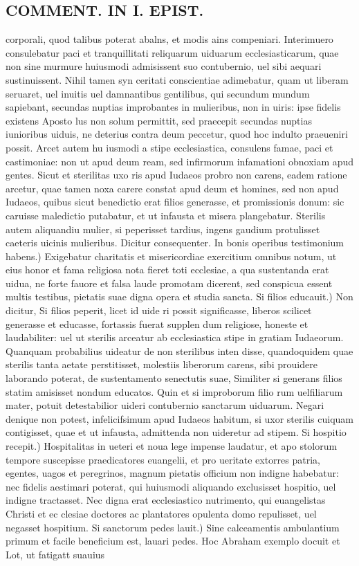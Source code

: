 \documentclass{article}
\begin{document}
\begin{pages}
\section*{COMMENT. IN I. EPIST. }
\marginpar{[ p.518 ]}\pstart corporali, quod talibus poterat abalns, et modis ains compeniari. Interimuero consulebatur paci et tranquillitati reliquarum uiduarum ecclesiasticarum, quae non sine murmure huiusmodi admisissent suo contubernio, uel sibi aequari sustinuissent. Nihil tamen syn ceritati conscientiae adimebatur, quam ut liberam seruaret, uel inuitis uel damnantibus gentilibus, qui secundum mundum sapiebant, secundas nuptias improbantes in mulieribus, non in uiris: ipse fidelis existens Aposto lus non solum permittit, sed praecepit secundas nuptias iunioribus uiduis, ne deterius contra deum peccetur, quod hoc indulto praeueniri possit. Arcet autem hu iusmodi a stipe ecclesiastica, consulens famae, paci et castimoniae: non ut apud deum ream, sed infirmorum infamationi obnoxiam apud gentes. Sicut et sterilitas uxo ris apud Iudaeos probro non carens, eadem ratione arcetur, quae tamen noxa carere constat apud deum et homines, sed non apud Iudaeos, quibus sicut benedictio erat filios generasse, et promissionis donum: sic caruisse maledictio putabatur, et ut infausta et misera plangebatur. Sterilis autem aliquandiu mulier, si peperisset tardius, ingens gaudium protulisset caeteris uicinis mulieribus. Dicitur consequenter. In bonis operibus testimonium habens.) Exigebatur charitatis et misericordiae exercitium omnibus notum, ut eius honor et fama religiosa nota fieret toti ecclesiae, a qua sustentanda erat uidua, ne forte fauore et falsa laude promotam dicerent, sed conspicua essent multis testibus, pietatis suae digna opera et studia sancta. Si filios educauit.) Non dicitur, Si filios peperit, licet id uide ri possit significasse, liberos scilicet generasse et educasse, fortassis fuerat supplen dum religiose, honeste et laudabiliter: uel ut sterilis arceatur ab ecclesiastica stipe in gratiam Iudaeorum. Quanquam probabilius uideatur de non sterilibus inten disse, quandoquidem quae sterilis tanta aetate perstitisset, molestiis liberorum carens, sibi prouidere laborando poterat, de sustentamento senectutis suae, Similiter si generans filios statim amisisset nondum educatos. Quin et si improborum filio rum uelfiliarum mater, potuit detestabilior uideri contubernio sanctarum uiduarum. Negari denique non potest, infelicifsimum apud Iudaeos habitum, si uxor sterilis cuiquam contigisset, quae et ut infausta, admittenda non uideretur ad stipem.  \pend\pstart Si hospitio recepit.) Hospitalitas in ueteri et noua lege impense laudatur, et apo stolorum tempore suscepisse praedicatores euangelii, et pro ueritate extorres patria, egentes, uagos et peregrinos, magnum pietatis officium non indigne habebatur: nec fidelis aestimari poterat, qui huiusmodi aliquando exclusisset hospitio, uel indigne tractasset. Nec digna erat ecclesiastico nutrimento, qui euangelistas Christi et ec clesiae doctores ac plantatores opulenta domo repulisset, uel negasset hospitium.  \pend\pstart Si sanctorum pedes lauit.) Sine calceamentis ambulantium primum et facile beneficium est, lauari pedes. Hoc Abraham exemplo docuit et Lot, ut fatigatt suauius 
\end{pages}
\end{document}
